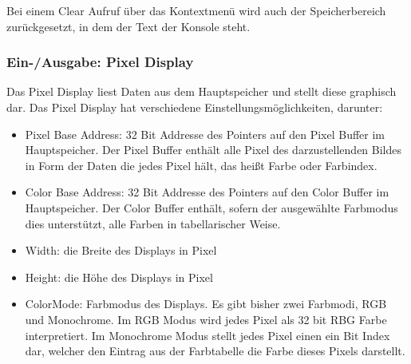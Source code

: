 \begin{warningblock}
Bei einem Clear Aufruf über das Kontextmenü wird auch der Speicherbereich
zurückgesetzt, in dem der Text der Konsole steht.
\end{warningblock}


\subsubsection{Ein-/Ausgabe: Pixel Display}
Das Pixel Display liest Daten aus dem Hauptspeicher und stellt diese graphisch
dar. Das Pixel Display hat verschiedene Einstellungsmöglichkeiten, darunter:

\begin{itemize}
\item Pixel Base Address: 32 Bit Addresse des Pointers auf den Pixel Buffer im
Hauptspeicher. Der Pixel Buffer enthält alle Pixel des darzustellenden Bildes
in Form der Daten die jedes Pixel hält, das heißt Farbe oder Farbindex.

\item Color Base Address: 32 Bit Addresse des Pointers auf den Color Buffer im
Hauptspeicher. Der Color Buffer enthält, sofern der ausgewählte Farbmodus dies
unterstützt, alle Farben in tabellarischer Weise.

\item Width: die Breite des Displays in Pixel
\item Height: die Höhe des Displays in Pixel

\item ColorMode: Farbmodus des Displays. Es gibt bisher zwei Farbmodi, RGB und
Monochrome. Im RGB Modus wird jedes Pixel als 32 bit RBG Farbe interpretiert.
Im Monochrome Modus stellt jedes Pixel einen ein Bit Index dar, welcher den
Eintrag aus der Farbtabelle die Farbe dieses Pixels darstellt.
\end{itemize}


